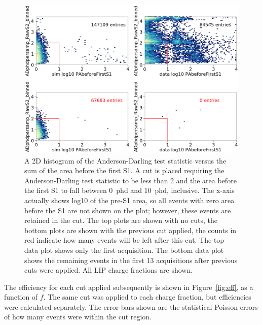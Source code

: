 \begin{figure}[htbp]
\begin{center}
\includegraphics[width=\textwidth]{figures/lips/cut8.png}
\caption{A 2D histogram of the Anderson-Darling test statistic versus the sum of the area before the first S1. A cut is placed requiring the Anderson-Darling test statistic to be less than 2 and the area before the first S1 to fall between 0~phd and 10~phd, inclusive. The x-axis actually shows log10 of the pre-S1 area, so all events with zero area before the S1 are not shown on the plot; however, these events are retained in the cut.  The top plots are shown with no cuts, the bottom plots are shown with the previous cut applied, the counts in red indicate how many events will be left after this cut. The top data plot shows only the first acquisition. The bottom data plot shows the remaining events in the first 13 acquisitions after previous cuts were applied. All \acs{LIP} charge fractions are shown. }
\label{fig:cut8}
\end{center}
\end{figure}

The efficiency for each cut applied subsequently is shown in Figure~\ref{fig:eff}, as a function of $f$. The same cut was applied to each charge fraction, but efficiencies were calculated separately. The error bars shown are the statistical Poisson errors of how many events were within the cut region. 

